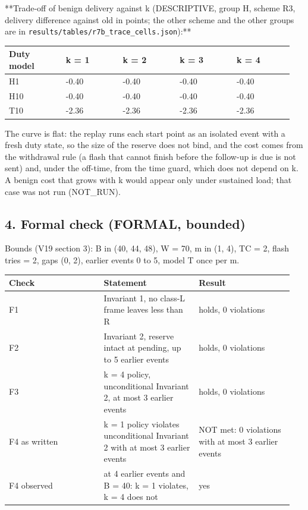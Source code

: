 **Trade-off of benign delivery against k (DESCRIPTIVE, group H, scheme R3, delivery difference against old in points; the other scheme and the other groups are in \texttt{results/tables/r7b\_trace\_cells.json}):**

{\scriptsize\raggedright
\begin{longtable}{p{0.190\linewidth}p{0.190\linewidth}p{0.190\linewidth}p{0.190\linewidth}p{0.190\linewidth}}
\toprule
Duty model & k = 1 & k = 2 & k = 3 & k = 4 \\
\midrule
\endhead
H1 & -0.40 & -0.40 & -0.40 & -0.40 \\
H10 & -0.40 & -0.40 & -0.40 & -0.40 \\
T10 & -2.36 & -2.36 & -2.36 & -2.36 \\
\bottomrule
\end{longtable}}

The curve is flat: the replay runs each start point as an isolated event with a fresh duty state, so the size of the reserve does not bind, and the cost comes from the withdrawal rule (a flash that cannot finish before the follow-up is due is not sent) and, under the off-time, from the time guard, which does not depend on k. A benign cost that grows with k would appear only under sustained load; that case was not run (NOT\_RUN).

\subsection*{4. Formal check (FORMAL, bounded)}

Bounds (V19 section 3): B in (40, 44, 48), W = 70, m in (1, 4), TC = 2, flash tries = 2, gaps (0, 2), earlier events 0 to 5, model T once per m.

{\scriptsize\raggedright
\begin{longtable}{p{0.317\linewidth}p{0.317\linewidth}p{0.317\linewidth}}
\toprule
Check & Statement & Result \\
\midrule
\endhead
F1 & Invariant 1, no class-L frame leaves less than R & holds, 0 violations \\
F2 & Invariant 2, reserve intact at pending, up to 5 earlier events & holds, 0 violations \\
F3 & k = 4 policy, unconditional Invariant 2, at most 3 earlier events & holds, 0 violations \\
F4 as written & k = 1 policy violates unconditional Invariant 2 with at most 3 earlier events & NOT met: 0 violations with at most 3 earlier events \\
F4 observed & at 4 earlier events and B = 40: k = 1 violates, k = 4 does not & yes \\
\bottomrule
\end{longtable}}

